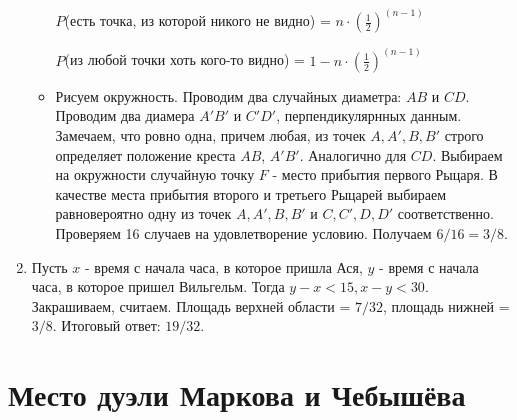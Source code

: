 \documentclass[a4paper,12pt]{article}
\begin{document}
\begin{enumerate}
\begin{itemize}
    $P$(есть точка, из которой никого не видно) = $n \cdot {(\frac{1}{2})}^{(n-1)}$

    $P$(из любой точки хоть кого-то видно) = $1 - n \cdot {(\frac{1}{2})}^{(n-1)} $

    \item Рисуем окружность. Проводим два случайных диаметра: $AB$ и $CD$. Проводим два диамера $A'B'$ и $C'D'$, перпендикулярнных данным. Замечаем, что ровно одна, причем любая, из точек $A, A', B, B'$ строго определяет положение креста $AB$, $A'B'$. Аналогично для $CD$. Выбираем на окружности случайную точку $F$ - место прибытия первого Рыцаря. В качестве места прибытия второго и третьего Рыцарей выбираем равновероятно одну из точек $A, A', B, B'$ и $C, C', D, D'$ соответственно. Проверяем 16 случаев на удовлетворение условию. Получаем $6/16 = 3/8$.
\end{itemize}

\item Пусть $x$ - время с начала часа, в которое пришла Ася, $y$ - время с начала часа, в которое пришел Вильгельм. Тогда $y - x < 15, x - y < 30$. Закрашиваем, считаем. Площадь верхней области = $7/32$, площадь нижней = $3/8$. Итоговый ответ: $19/32$.
\end{enumerate}

\newpage
\section{Место дуэли Маркова и Чебышёва} %
\end{document}
